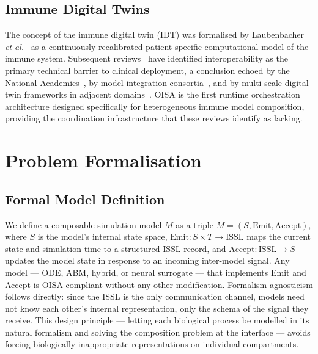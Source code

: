 \documentclass[conference,letterpaper,10pt]{IEEEtran}
\begin{document}
\subsection{Immune Digital Twins}

The concept of the immune digital twin (IDT) was formalised by
Laubenbacher \emph{et al.}~\cite{laubenbacher2022roadmap} as a
continuously-recalibrated patient-specific computational model of the
immune system. Subsequent
reviews~\cite{laubenbacher2024forum,niarakis2024idt} have identified
interoperability as the primary technical barrier to clinical
deployment, a conclusion echoed by the National
Academies~\cite{nasem2023digitaltwins}, by model integration
consortia~\cite{karr2022modelintegration}, and by multi-scale digital
twin frameworks in adjacent domains~\cite{viceconti2024vht}. OISA is
the first runtime orchestration architecture designed specifically for
heterogeneous immune model composition, providing the coordination
infrastructure that these reviews identify as lacking.

\section{Problem Formalisation}

\subsection{Formal Model Definition}
We define a composable simulation model $M$ as a triple
$M\!=\!(S,\mathrm{Emit},\mathrm{Accept})$, where $S$ is the model's
internal state space,
$\mathrm{Emit}\!:\!S\!\times\!T\!\to\!\mathrm{ISSL}$ maps the current
state and simulation time to a structured ISSL record, and
$\mathrm{Accept}\!:\!\mathrm{ISSL}\!\to\!S$ updates the model state in
response to an incoming inter-model signal. Any model --- ODE, ABM,
hybrid, or neural surrogate --- that implements Emit and Accept is
OISA-compliant without any other modification. Formalism-agnosticism
follows directly: since the ISSL is the only communication channel,
models need not know each other's internal representation, only the
schema of the signal they receive. This design principle --- letting
each biological process be modelled in its natural formalism and
solving the composition problem at the interface --- avoids forcing
biologically inappropriate representations on individual compartments.
\end{document}
